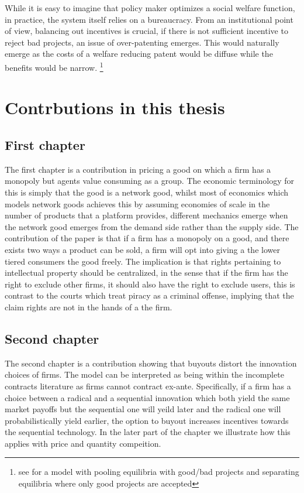 \documentclass[12pt]{article}
\numberwithin{equation}{section}
\begin{document}
While it is easy to imagine that policy maker optimizes a social welfare function, in practice, the system itself relies on a bureaucracy. From an institutional point of view, balancing out incentives is crucial, if there is not sufficient incentive to reject bad projects, an issue of over-patenting emerges. This would naturally emerge as the costs of a welfare reducing patent would be diffuse while the benefits would be narrow. \footnote{see \cite{Caillaud2012} for a model with pooling equilibria with good/bad projects and separating equilibria where only good projects are accepted}




\section{Contrbutions in this thesis}

\subsection{First chapter}

The first chapter is a contribution in pricing a good on which a firm has a monopoly but agents value consuming as a group. The economic terminology for this is simply that the good is a network good, whilst most of economics which models network goods achieves this by assuming economies of scale in the number of products that a platform provides, different mechanics emerge when the network good emerges from the demand side rather than the supply side. The contribution of the paper is that if a firm has a monopoly on a good, and there exists two ways a product can be sold, a firm will opt into giving a the lower tiered consumers the good freely. The implication is that rights pertaining to intellectual property should be centralized, in the sense that if the firm has the right to exclude other firms, it should also have the right to exclude users, this is contrast to the courts which treat piracy as a criminal offense, implying that the claim rights are not in the hands of a the firm.


\subsection{Second chapter}

The second chapter is a contribution showing that buyouts distort the innovation choices of firms. The model can be interpreted as being within the incomplete contracts literature as firms cannot contract ex-ante. Specifically, if a firm has a choice between a radical and a sequential innovation which both yield the same market payoffs but the sequential one will yeild later and the radical one will probabilistically yield earlier, the option to buyout increases incentives towards the sequential technology. In the later part of the chapter we illustrate how this applies with price and quantity compeition.
\end{document}
